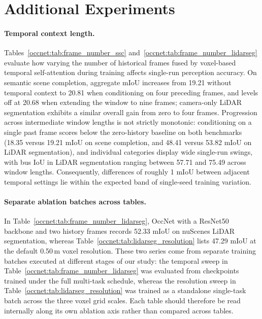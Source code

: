 \section{Additional Experiments}\label{occnet:app:experiments}

\paragraph{Temporal context length.} Tables~\ref{occnet:tab:frame_number_ssc} and~\ref{occnet:tab:frame_number_lidarseg} evaluate how varying the number of historical frames fused by voxel-based temporal self-attention during training affects single-run perception accuracy. On semantic scene completion, aggregate mIoU increases from 19.21 without temporal context to 20.81 when conditioning on four preceding frames, and levels off at 20.68 when extending the window to nine frames; camera-only LiDAR segmentation exhibits a similar overall gain from zero to four frames. Progression across intermediate window lengths is not strictly monotonic: conditioning on a single past frame scores below the zero-history baseline on both benchmarks (18.35 versus 19.21 mIoU on scene completion, and 48.41 versus 53.82 mIoU on LiDAR segmentation), and individual categories display wide single-run swings, with bus IoU in LiDAR segmentation ranging between 57.71 and 75.49 across window lengths. Consequently, differences of roughly 1 mIoU between adjacent temporal settings lie within the expected band of single-seed training variation.

\paragraph{Separate ablation batches across tables.} In Table~\ref{occnet:tab:frame_number_lidarseg}, OccNet with a ResNet50 backbone and two history frames records 52.33 mIoU on nuScenes LiDAR segmentation, whereas Table~\ref{occnet:tab:lidarseg_resolution} lists 47.29 mIoU at the default 0.50\,m voxel resolution. These two series come from separate training batches executed at different stages of our study: the temporal sweep in Table~\ref{occnet:tab:frame_number_lidarseg} was evaluated from checkpoints trained under the full multi-task schedule, whereas the resolution sweep in Table~\ref{occnet:tab:lidarseg_resolution} was trained as a standalone single-task batch across the three voxel grid scales. Each table should therefore be read internally along its own ablation axis rather than compared across tables.

